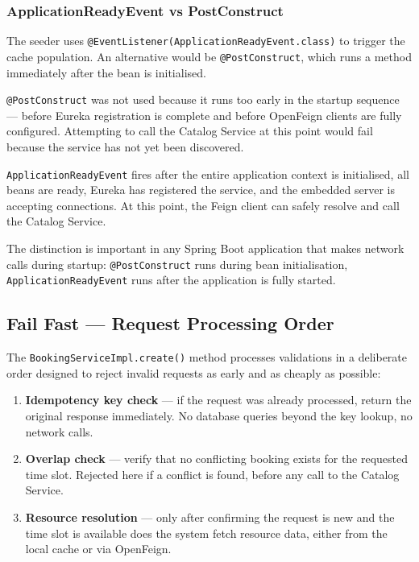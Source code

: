\subsubsection{ApplicationReadyEvent vs PostConstruct}

The seeder uses \texttt{@EventListener(ApplicationReadyEvent.class)} to trigger the cache population. An alternative would be \texttt{@PostConstruct}, which runs a method immediately after the bean is initialised.

\texttt{@PostConstruct} was not used because it runs too early in the startup sequence --- before Eureka registration is complete and before OpenFeign clients are fully configured. Attempting to call the Catalog Service at this point would fail because the service has not yet been discovered.

\texttt{ApplicationReadyEvent} fires after the entire application context is initialised, all beans are ready, Eureka has registered the service, and the embedded server is accepting connections. At this point, the Feign client can safely resolve and call the Catalog Service.

The distinction is important in any Spring Boot application that makes network calls during startup: \texttt{@PostConstruct} runs during bean initialisation, \texttt{ApplicationReadyEvent} runs after the application is fully started.

\subsection{Fail Fast — Request Processing Order}

The \texttt{BookingServiceImpl.create()} method processes validations in a deliberate order designed to reject invalid requests as early and as cheaply as possible:

\begin{enumerate}
    \item \textbf{Idempotency key check} --- if the request was already processed, return the original response immediately. No database queries beyond the key lookup, no network calls.
    \item \textbf{Overlap check} --- verify that no conflicting booking exists for the requested time slot. Rejected here if a conflict is found, before any call to the Catalog Service.
    \item \textbf{Resource resolution} --- only after confirming the request is new and the time slot is available does the system fetch resource data, either from the local cache or via OpenFeign.
\end{enumerate}

